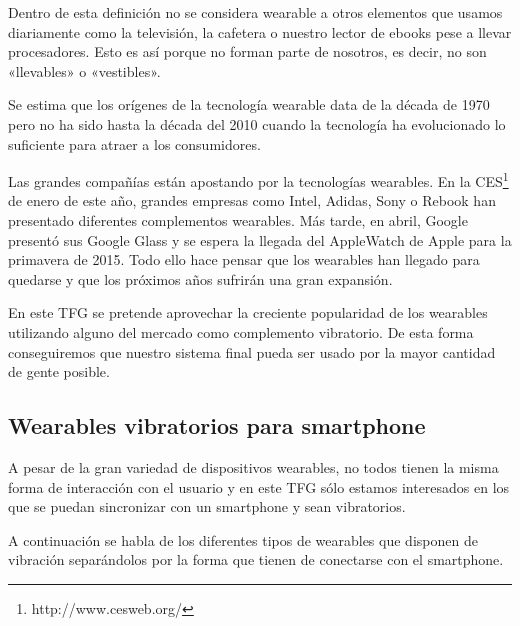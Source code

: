 Dentro de esta definición no se considera wearable a otros elementos que usamos diariamente como la
televisión, la cafetera o nuestro lector de ebooks pese a llevar procesadores. Esto es así porque no
forman parte de nosotros, es decir, no son «llevables» o «vestibles».

Se estima que los orígenes de la tecnología wearable data de la década de 1970 pero no ha sido hasta
la década del 2010 cuando la tecnología ha evolucionado lo suficiente para atraer a los
consumidores. 

Las grandes compañías están apostando por la tecnologías wearables.  En la
\acf{CES}\footnote{http://www.cesweb.org/} de enero de este año, grandes empresas como Intel,
Adidas, Sony o Rebook han presentado diferentes complementos wearables. Más tarde, en abril, Google
presentó sus Google Glass y se espera la llegada del AppleWatch de Apple para la primavera de
2015. Todo ello hace pensar que los wearables han llegado para quedarse y que los próximos años
sufrirán una gran expansión.

En este \acs{TFG} se pretende aprovechar la creciente popularidad de los wearables utilizando alguno
del mercado como complemento vibratorio. De esta forma conseguiremos que nuestro sistema final pueda
ser usado por la mayor cantidad de gente posible.

\subsection{Wearables vibratorios para smartphone}

A pesar de la gran variedad de dispositivos wearables, no todos tienen la misma forma de interacción
con el usuario y en este \acs{TFG} sólo estamos interesados en los que se puedan sincronizar con un
smartphone y sean vibratorios.

A continuación se habla de los diferentes tipos de wearables que disponen de vibración separándolos
por la forma que tienen de conectarse con el smartphone.

